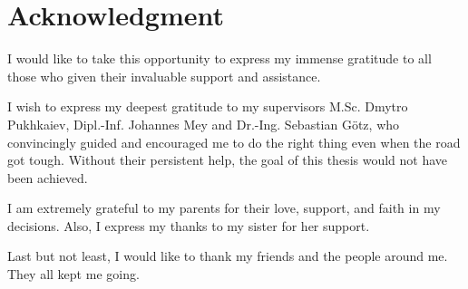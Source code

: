 \section*{Acknowledgment}
I would like to take this opportunity to express my immense gratitude to all those who given their invaluable support and assistance.

I wish to express my deepest gratitude to my supervisors M.Sc. Dmytro Pukhkaiev, Dipl.-Inf. Johannes Mey and Dr.-Ing. Sebastian Götz, who convincingly guided and encouraged me to do the right thing even when the road got tough. Without their persistent help, the goal of this thesis would not have been achieved.

I am extremely grateful to my parents for their love,  support, and faith in my decisions.  Also, I express my thanks to my sister for her support. 

Last but not least, I would like to thank my friends and the people around me. They all kept me going. 